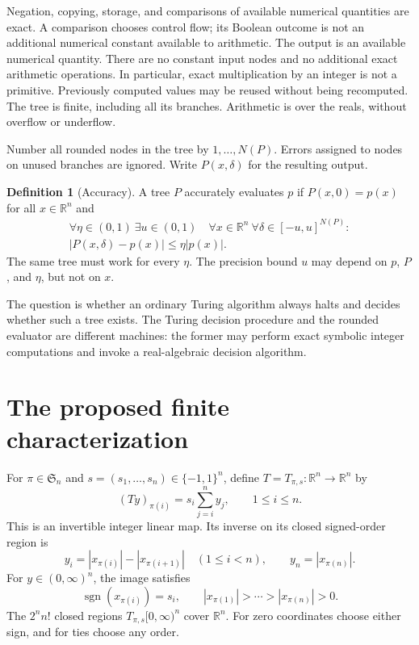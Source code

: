\documentclass[11pt,a4paper]{article}
\numberwithin{equation}{section}
\theoremstyle{definition}
\newtheorem{definition}[theorem]{Definition}
\theoremstyle{remark}
\newcommand{\R}{\mathbb R}
\newcommand{\Sn}{\mathfrak S_n}
\newcommand{\abs}[1]{\left|#1\right|}
\newcommand{\sgn}{\operatorname{sgn}}
\begin{document}
Negation, copying, storage, and comparisons of available numerical
quantities are exact.  A comparison chooses control flow; its Boolean
outcome is not an additional numerical constant available to arithmetic.
The output is an available numerical quantity.  There are no constant
input nodes and no additional exact arithmetic operations.  In
particular, exact multiplication by an integer is not a primitive.
Previously computed values may be reused without being recomputed.
The tree is finite, including all its branches.  Arithmetic is over the
reals, without overflow or underflow.

Number all rounded nodes in the tree by $1,\ldots,N(P)$.  Errors assigned
to nodes on unused branches are ignored.  Write $P(x,\delta)$ for the
resulting output.

\begin{definition}[Accuracy]\label{def:accuracy}
A tree $P$ accurately evaluates $p$ if $P(x,0)=p(x)$ for all $x\in\R^n$
and
\begin{equation}\label{eq:accuracy}
\begin{gathered}
 \forall\eta\in(0,1)\ \exists u\in(0,1)\quad
 \forall x\in\R^n\ \forall\delta\in[-u,u]^{N(P)}:\\
 \abs{P(x,\delta)-p(x)}\le\eta\abs{p(x)}.
\end{gathered}
\end{equation}
The same tree must work for every $\eta$.  The precision bound $u$ may
depend on $p$, $P$, and $\eta$, but not on $x$.
\end{definition}

The question is whether an ordinary Turing algorithm always halts and
decides whether such a tree exists.  The Turing decision procedure and the
rounded evaluator are different machines: the former may perform exact
symbolic integer computations and invoke a real-algebraic decision
algorithm.

\section{The proposed finite characterization}\label{sec:criterion}

For $\pi\in\Sn$ and $s=(s_1,\ldots,s_n)\in\{-1,1\}^n$, define
$T=T_{\pi,s}:\R^n\to\R^n$ by
\begin{equation}\label{eq:T}
 (Ty)_{\pi(i)}=s_i\sum_{j=i}^n y_j,\qquad 1\le i\le n.
\end{equation}
This is an invertible integer linear map.  Its inverse on its closed
signed-order region is
\begin{equation}\label{eq:gaps}
 y_i=\abs{x_{\pi(i)}}-\abs{x_{\pi(i+1)}}\quad(1\le i<n),
 \qquad y_n=\abs{x_{\pi(n)}}.
\end{equation}
For $y\in(0,\infty)^n$, the image satisfies
\[
 \sgn(x_{\pi(i)})=s_i,
 \qquad \abs{x_{\pi(1)}}>\cdots>\abs{x_{\pi(n)}}>0.
\]
The $2^n n!$ closed regions $T_{\pi,s}[0,\infty)^n$ cover $\R^n$.
For zero coordinates choose either sign, and for ties choose any order.
\end{document}
